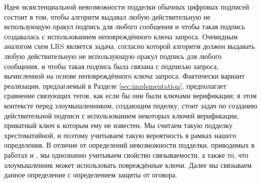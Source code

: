 \documentclass{llncs}
\begin{document}
Идея экзистенциальной невозможности подделки обычных цифровых подписей состоит в том, чтобы алгоритм выдавал любую действительную не использующую оракул подпись для любого сообщения и чтобы такая подпись создавалась с использованием неповреждённого ключа запроса. Очевидным аналогом схем LRS является задача, согласно которой алгоритм должен выдавать любую действительную не использующую оракул подпись для любого сообщения, и чтобы такая подпись была связана с подписью запроса, вычисленной на основе неповреждённого ключа запроса. Фактически вариант реализации, предлагаемый в Разделе \ref{sec:implementation}, предполагает сравнение связующих тегов, как если бы они были ключами верификации; в этом контексте перед злоумышленником, создающим поделку, стоит задач по созданию действительной подписи с использованием некоторых ключей верификации, приватный ключ к которым ему не известен. Мы считаем такую подделку хрестоматийной, и поэтому учитываем такую вероятность в рамках нашего определения. В отличие от определений невозможности подделки, приводимых в работах \cite{au2006short} и \cite{backes2019ring}, мы однозначно учитываем свойство связываемости, а также то, что злоумышленник может использовать повреждённые ключи. Далее мы связываем данное определение с определением защиты от оговора.
\end{document}
